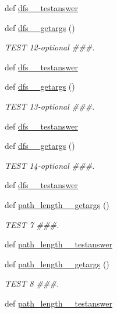 \begin{DoxyCompactItemize}
def \hyperlink{namespacetests_a235fe85b6e0337a89a1305b810adc0bc}{dfs\+\_\+\_\+testanswer}
\item 
def \hyperlink{namespacetests_a3308ae5f92fd48f018e5512eba4326ca}{dfs\+\_\+\_\+getargs} ()
\begin{DoxyCompactList}\small\item\em T\+E\+S\+T 12-\/optional \#\#\#. \end{DoxyCompactList}\item 
def \hyperlink{namespacetests_aafaea1d13ad4e4c70138e10096badf00}{dfs\+\_\+\_\+testanswer}
\item 
def \hyperlink{namespacetests_ad3be1924aa4a548779f0b8b8ebc6cd91}{dfs\+\_\+\_\+getargs} ()
\begin{DoxyCompactList}\small\item\em T\+E\+S\+T 13-\/optional \#\#\#. \end{DoxyCompactList}\item 
def \hyperlink{namespacetests_a5297856c1f28ec2991591607cd3a31c6}{dfs\+\_\+\_\+testanswer}
\item 
def \hyperlink{namespacetests_a1463a65eb93585f8881b729fad009141}{dfs\+\_\+\_\+getargs} ()
\begin{DoxyCompactList}\small\item\em T\+E\+S\+T 14-\/optional \#\#\#. \end{DoxyCompactList}\item 
def \hyperlink{namespacetests_a593870dce48ffdb3fb197e94ac2084b3}{dfs\+\_\+\_\+testanswer}
\item 
def \hyperlink{namespacetests_a36f4f5becf64066b7d4f6b473022fefa}{path\+\_\+length\+\_\+\_\+getargs} ()
\begin{DoxyCompactList}\small\item\em T\+E\+S\+T 7 \#\#\#. \end{DoxyCompactList}\item 
def \hyperlink{namespacetests_a87fe0d5971e53d6d5fdd9ed151befa9d}{path\+\_\+length\+\_\+\_\+testanswer}
\item 
def \hyperlink{namespacetests_a85478108010b3b390e3c281b6677d575}{path\+\_\+length\+\_\+\_\+getargs} ()
\begin{DoxyCompactList}\small\item\em T\+E\+S\+T 8 \#\#\#. \end{DoxyCompactList}\item 
def \hyperlink{namespacetests_a929c437d956eac156576a3eda727af58}{path\+\_\+length\+\_\+\_\+testanswer}
\item 

\end{DoxyCompactItemize}
